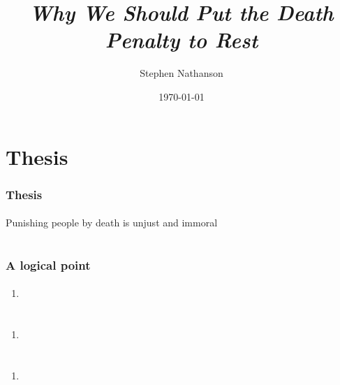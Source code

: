 \documentclass{beamer}
\begin{document}
\title{\emph{Why We Should Put the Death Penalty to Rest}}
\author{Stephen Nathanson} %
\date{\today}

\section{Thesis}

\begin{frame}
    \frametitle{Thesis}
    \framesubtitle{}

Punishing people by death is unjust and immoral
\end{frame}

\section{}    

\begin{frame}
    \frametitle{A logical point}
    \framesubtitle{}

\begin{enumerate}
\item 

\end{enumerate}


\end{frame}

\section{}

\begin{frame}
    \frametitle{}
    \framesubtitle{}
\begin{enumerate}
\item 


\end{enumerate}



\end{frame}


\section{}

\begin{frame}
    \frametitle{}
    \framesubtitle{}
\begin{enumerate}
\item 


\end{enumerate}



\end{frame}
\end{document}
